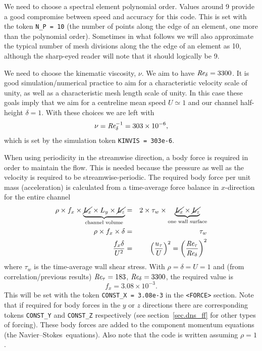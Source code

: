 \documentclass[11pt]{report}
\def\Rey{\mbox{\it Re}}                             %
\newcommand\NavSto{Navier--Stokes}
\begin{document}
We need to choose a spectral element polynomial order. Values around 9
provide a good compromise between speed and accuracy for this
code. This is set with the token \texttt{N\_P = 10} (the number of
points along the edge of an element, one more than the polynomial
order).  Sometimes in what follows we will also approximate the
typical number of mesh divisions along the the edge of an element as
10, although the sharp-eyed reader will note that it should logically
be 9.

We need to choose the kinematic viscosity, $\nu$. We aim to have
$\Rey_\delta=3300$. It is good simulation/numerical practice to aim
for a characteristic velocity scale of unity, as well as a
characteristic mesh length scale of unity. In this case these goals
imply that we aim for a centreline mean speed $U\simeq1$ and our
channel half-height $\delta=1$.  With these choices we are left with
\[
  \nu = \Rey_\delta^{-1} = 303 \times 10^{-6},
\]
which is set by the simulation token \texttt{KINVIS = 303e-6}.

When using periodicity in the streamwise direction, a body force is
required in order to maintain the flow.  This is needed because the
pressure as well as the velocity is required to be
streamwise-periodic. The required body force per unit mass
(\ie acceleration) is calculated from a time-average force balance in
$x$-direction for the entire channel
\begin{eqnarray*}
 \rho \times f_x \times
  \underbrace{\cancel{L_x} \times L_y \times \cancel{L_z}}_{\text{channel
    volume}}  &=& 2 \times \tau_w \times \underbrace{\cancel{L_x} \times
    \cancel{L_z}}_{\text{one wall surface}} \\ 
   \rho \times f_x \times \delta & = & \tau_w\\
    \frac{f_x\delta}{U^2} & = & \left(\frac{u_\tau}{U}\right)^2 = 
    \left(\frac{\Rey_\tau}{\Rey_\delta}\right)^2
  \label{eq:force_balance}
\end{eqnarray*}
where $\tau_w$ is the time-average wall shear stress.  With $\rho =
\delta = U= 1$ and (from correlation/previous results)
$\Rey_\tau=183$, $\Rey_\delta=3300$, the required value is
\[
  f_x = 3.08 \times 10^{-3} .
\]
This will be set with the token \texttt{CONST\_X = 3.08e-3} in the 
\texttt{<FORCE>} section.  Note that if
required for body forces in the $y$ or $z$ directions there are
corresponding tokens \texttt{CONST\_Y} and \texttt{CONST\_Z} respectively 
(see section~\ref{sec.dns_ff} for other types of forcing).
These body forces are added to the component momentum equations (the
\NavSto\ equations).  Also note that the code is written assuming
$\rho=1$.
\end{document}
